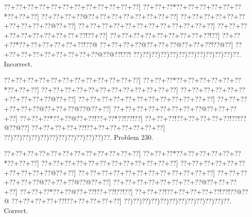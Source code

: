 \documentclass[a5paper]{article}
\begin{document}
\begin{center}
{\goo
\0??+\0??+\0??+\0??+\0??+\0??+\0??+\0??+\0??+\0??+\0??+\0??]
\0??+\0??+\0??*\0??+\0??+\0??+\0??+\0??+\0??*\0??+\0??+\0??]
\0??+\0??+\0??+\0??@\0??+\0??+\0??+\0??+\0??+\0??+\0??+\0??]
\0??+\0??+\0??+\0??+\0??+\0??+\0??+\0??+\0??+\0??@\0??+\0??]
\0??+\0??+\0??+\0??+\0??+\0??+\0??+\0??+\0??+\0??+\0??+\0??]
\0??+\0??+\0??+\0??+\0??+\0??+\0??+\0??+\0??+\0??!\0??+\0??]
\0??+\0??+\0??+\0??+\0??+\0??+\0??+\0??+\0??!\0??]
\0??+\0??+\0??*\0??+\0??+\0??+\0??+\0??+\0??!\0??@
\0??+\0??+\0??+\0??@\0??+\0??+\0??@\0??+\0??+\0??!\0??@\0??]
\0??+\0??+\0??+\0??+\0??+\0??+\0??+\0??+\0??@\0??@\0??!\0??!
\0??)\0??)\0??)\0??)\0??)\0??)\0??)\0??)\0??)\0??)\0??)\0??.
}
Incorrect. 

\end{center}
\newpage
\begin{center}
{\goo
\0??+\0??+\0??+\0??+\0??+\0??+\0??+\0??+\0??+\0??+\0??+\0??]
\0??+\0??+\0??*\0??+\0??+\0??+\0??+\0??+\0??*\0??+\0??+\0??]
\0??+\0??+\0??+\0??+\0??+\0??+\0??+\0??+\0??+\0??+\0??+\0??]
\0??+\0??+\0??+\0??+\0??+\0??+\0??+\0??+\0??+\0??@\0??+\0??]
\0??+\0??+\0??+\0??+\0??+\0??+\0??+\0??+\0??+\0??+\0??+\0??]
\0??+\0??+\0??+\0??+\0??+\0??@\0??+\0??+\0??@\0??@\0??+\0??]
\0??+\0??+\0??+\0??+\0??+\0??+\0??+\0??@\0??+\0??+\0??+\0??]
\0??+\0??+\0??*\0??+\0??@\0??+\0??!\0??+\0??*\0??!\0??!\0??]
\0??+\0??+\0??!\0??+\0??+\0??+\0??+\0??!\0??!\0??@\0??@\0??]
\0??+\0??+\0??+\0??+\0??!\0??+\0??+\0??+\0??+\0??+\0??+\0??]
\0??)\0??)\0??)\0??)\0??)\0??)\0??)\0??)\0??)\0??)\0??)\0??.
}
Problem 230.

\end{center}
\begin{center}
{\goo
\0??+\0??+\0??+\0??+\0??+\0??+\0??+\0??+\0??+\0??+\0??+\0??]
\0??+\0??+\0??*\0??+\0??+\0??+\0??+\0??+\0??*\0??+\0??+\0??]
\0??+\0??+\0??+\0??+\0??+\0??+\0??+\0??+\0??+\0??+\0??+\0??]
\0??+\0??+\0??+\0??+\0??+\0??+\0??+\0??+\0??+\0??@\0??+\0??]
\0??+\0??+\0??+\0??+\0??+\0??+\0??+\0??+\0??+\0??+\0??+\0??]
\0??+\0??+\0??+\0??+\0??+\0??@\0??+\0??+\0??@\0??@\0??+\0??]
\0??+\0??+\0??+\0??+\0??+\0??+\0??+\0??@\0??+\0??+\0??+\0??]
\0??+\0??+\0??*\0??+\0??@\0??+\0??!\0??+\0??!\0??!\0??]
\0??+\0??+\0??!\0??+\0??+\0??+\0??+\0??!\0??!\0??@\0??@
\0??+\0??+\0??+\0??+\0??!\0??+\0??+\0??+\0??+\0??]
\0??)\0??)\0??)\0??)\0??)\0??)\0??)\0??)\0??)\0??)\0??)\0??.
}
Correct. 

\end{center}
\end{document}

